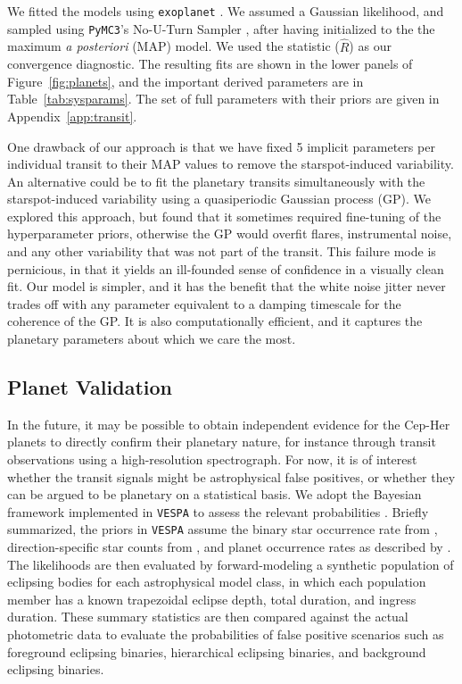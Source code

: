 \documentclass[12pt,twocolumn]{aastex63}
\begin{document}
We fitted the models using \texttt{exoplanet}
\citep{exoplanet:exoplanet}.  We assumed a Gaussian likelihood, and
sampled using \texttt{PyMC3}'s No-U-Turn Sampler
\citep{hoffman_no-u-turn_2014}, after having initialized to the the
maximum {\it a posteriori} (MAP) model.  We used the
\citet{gelman_inference_1992} statistic ($\hat{R}$) as our convergence
diagnostic.  The resulting fits are shown in the lower panels of
Figure~\ref{fig:planets}, and the important derived parameters are in
Table~\ref{tab:sysparams}.  The set of full parameters with their
priors are given in Appendix~\ref{app:transit}.

One drawback of our approach is that we have fixed 5 implicit
parameters per individual transit to their MAP values to remove the
starspot-induced variability.  An alternative could be to fit the
planetary transits simultaneously with the starspot-induced
variability using a quasiperiodic Gaussian process (GP).  We
explored this approach, but found that it sometimes required fine-tuning
of the hyperparameter priors, otherwise the GP would 
overfit flares, instrumental noise, and any other variability that was not
part of the transit.  This failure mode is pernicious, in that it yields an
ill-founded sense of confidence in a visually clean
fit.  Our model is simpler, and it has the benefit that the white
noise jitter never trades off with any parameter equivalent to a
damping timescale for the coherence of the GP.  It is also
computationally efficient, and it captures the planetary parameters
about which we care the most.


\subsection{Planet Validation}

In the future, it may be possible to obtain independent evidence for
the Cep-Her planets to directly confirm their planetary nature, for
instance through transit observations using a high-resolution
spectrograph.  For now, it is of interest whether the transit signals
might be astrophysical false positives, or whether they can be argued
to be planetary on a statistical basis.  We adopt the Bayesian
framework implemented in \texttt{VESPA} to assess the relevant
probabilities \citep{morton_efficient_2012,vespa_2015}.  Briefly
summarized, the priors in \texttt{VESPA} assume the binary star
occurrence rate from \citet{raghavan_survey_2010}, direction-specific
star counts from \citet{girardi_star_2005}, and planet occurrence
rates as described by \citet[][Section~3.4]{morton_efficient_2012}.
The likelihoods are then evaluated by forward-modeling a synthetic
population of eclipsing bodies for each astrophysical model class, in
which each population member has a known trapezoidal eclipse depth,
total duration, and ingress duration.  These summary statistics are
then compared against the actual photometric data to evaluate the
probabilities of false positive scenarios such as foreground eclipsing
binaries, hierarchical eclipsing binaries, and background eclipsing
binaries.
\end{document}
